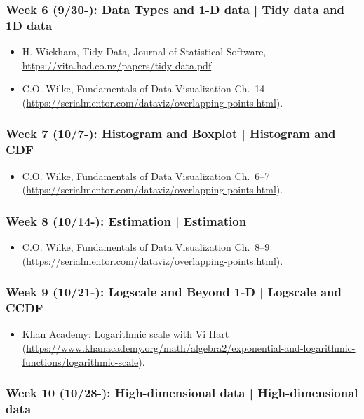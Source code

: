 \documentclass[11pt,article,oneside]{memoir} %
\begin{document}
\subsubsection{Week 6 (9/30-): Data Types and 1-D data | Tidy data and 1D data } %

\begin{itemize}\itemsep0em 
\item H. Wickham, Tidy Data, Journal of Statistical Software, \url{https://vita.had.co.nz/papers/tidy-data.pdf}
\item C.O. Wilke, Fundamentals of Data Visualization Ch.~14 (\url{https://serialmentor.com/dataviz/overlapping-points.html}). 
\end{itemize}	
\subsubsection{Week 7 (10/7-): Histogram and Boxplot | Histogram and CDF }%

\begin{itemize}\itemsep0em 
\item C.O. Wilke, Fundamentals of Data Visualization Ch.~6--7 (\url{https://serialmentor.com/dataviz/overlapping-points.html}). 
\end{itemize}	
\subsubsection{Week 8 (10/14-): Estimation | Estimation }%

\begin{itemize}\itemsep0em 
\item C.O. Wilke, Fundamentals of Data Visualization Ch.~8--9 (\url{https://serialmentor.com/dataviz/overlapping-points.html}). 
\end{itemize}	
\subsubsection{Week 9 (10/21-): Logscale and Beyond 1-D | Logscale and CCDF}%

\begin{itemize}\itemsep0em 
\item Khan Academy: Logarithmic scale with Vi Hart (\url{https://www.khanacademy.org/math/algebra2/exponential-and-logarithmic-functions/logarithmic-scale}). 
\end{itemize}	
\subsubsection{Week 10 (10/28-): High-dimensional data | High-dimensional data }%
\end{document}
